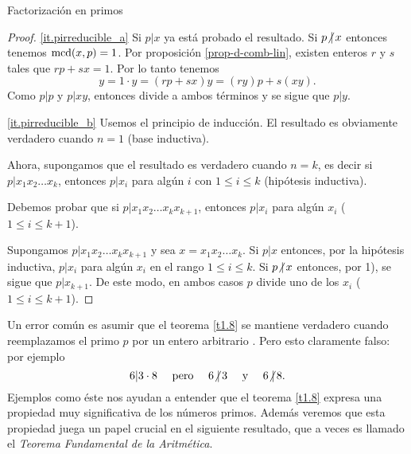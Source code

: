\begin{section}{Factorización en primos}
\begin{proof}
\ref{it.pirreducible_a}  Si $p|x$ ya está probado el resultado. Si $p{{\operatorname{\not|\,} }}x$ entonces tenemos $\operatorname{mcd}(x,p)=1$. Por proposición \ref{prop-d-comb-lin}, existen enteros $r$ y $s$ tales que $rp+sx=1$. Por lo tanto tenemos 
$$
y = 1 \cdot y = (rp+sx)y =(ry)p+s(xy).
$$
Como $p|p$ y $p|xy$, entonces divide a ambos términos y se sigue que $p|y$. 

\ref{it.pirreducible_b} Usemos el principio de inducción. El resultado es obviamente verdadero cuando $n=1$ (base inductiva). 

Ahora, supongamos que el resultado es verdadero cuando $n=k$, es decir si $p|x_1x_2\ldots x_k$, entonces 
$p|x_i$ para algún $i$ con $1\le i \le k$ (hipótesis inductiva).

Debemos probar que si $p|x_1x_2\ldots x_{k}x_{k+1}$, entonces  $p|x_i$ para algún $x_i$ ($1\le i \le k+1$).

Supongamos $p|x_1x_2\ldots x_{k}x_{k+1}$ y sea $x=x_1x_2\ldots x_k$. Si $p|x$ entonces, por la hipótesis inductiva, $p|x_i$ para algún $x_i$ en el rango $1\le i \le k$. Si $p{{\operatorname{\not|\,} }}x$ entonces, por 1), se sigue que $p|x_{k+1}$. De este modo, en ambos casos $p$ divide uno de los $x_i$ ($1\le i\le k+1$). 
\end{proof}

Un error común es asumir que el teorema \ref{t1.8} se mantiene verdadero cuando reemplazamos el primo $p$ por un entero arbitrario . Pero esto claramente falso: por ejemplo 
$$
6| 3\cdot 8 \quad \text{ pero } \quad 6{\operatorname{\not|\,} } 3 \quad \text{ y }\quad 6{\operatorname{\not|\,} }8.
$$
Ejemplos como éste nos ayudan a entender que el teorema \ref{t1.8} expresa una propiedad muy significativa de los números primos. Además veremos que esta propiedad juega un papel crucial en el siguiente resultado, que a veces es llamado el \textit{Teorema Fundamental de la Aritmética}. 


\end{section}

